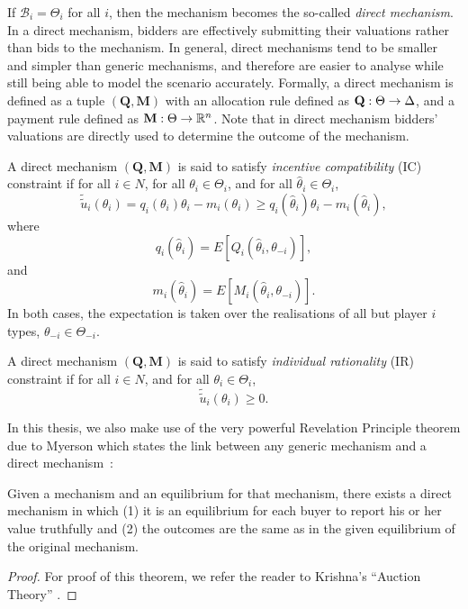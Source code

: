 If $\mathcal{B}_i = \Theta_i$ for all $i$, then the mechanism becomes the so-called \emph{direct mechanism}. In a direct mechanism, bidders are effectively submitting their valuations rather than bids to the mechanism. In general, direct mechanisms tend to be smaller and simpler than generic mechanisms, and therefore are easier to analyse while still being able to model the scenario accurately. Formally, a direct mechanism is defined as a tuple $(\mathbf{Q},\mathbf{M})$ with an allocation rule defined as $\mathbf{Q}:\nobreak\Theta\to\Delta$, and a payment rule defined as $\mathbf{M}:\nobreak\Theta\to\mathbb{R}^n$. Note that in direct mechanism bidders' valuations are directly used to determine the outcome of the mechanism.

A direct mechanism $(\mathbf{Q},\mathbf{M})$ is said to satisfy \emph{incentive compatibility} (IC) constraint if for all $i\in N$, for all $\theta_i\in\Theta_i$, and for all $\hat{\theta}_i\in\Theta_i$,
\begin{equation*}
  \tilde{\tilde{u}}_i(\theta_i) = q_i(\theta_i)\theta_i - m_i(\theta_i)\ge q_i(\hat{\theta}_i)\theta_i - m_i(\hat{\theta}_i),
\end{equation*}
where
\begin{equation*}
  q_i(\hat{\theta}_i) = E[Q_i(\hat{\theta}_i,\theta_{-i})],
\end{equation*}
and
\begin{equation*}
  m_i(\hat{\theta}_i) = E[M_i(\hat{\theta}_i, \theta_{-i})].
\end{equation*}
In both cases, the expectation is taken over the realisations of all but player $i$ types, $\theta_{-i}\in\Theta_{-i}$.

A direct mechanism $(\mathbf{Q}, \mathbf{M})$ is said to satisfy \emph{individual rationality} (IR) constraint if for all $i\in N$, and for all $\theta_i\in\Theta_i$,
\begin{equation*}
  \tilde{\tilde{u}}_i(\theta_i)\ge 0.
\end{equation*}

In this thesis, we also make use of the very powerful Revelation Principle theorem due to Myerson which states the link between any generic mechanism and a direct mechanism~\cite{Myerson1979, Krishna10}:
\begin{thm}
\label{thm:revelation_principle_notation}
Given a mechanism and an equilibrium for that mechanism, there exists a direct mechanism in which (1) it is an equilibrium for each buyer to report his or her value truthfully and (2) the outcomes are the same as in the given equilibrium of the original mechanism.
\end{thm}
\begin{proof}
For proof of this theorem, we refer the reader to Krishna's ``Auction Theory'' \cite{Krishna10}.
\end{proof}

